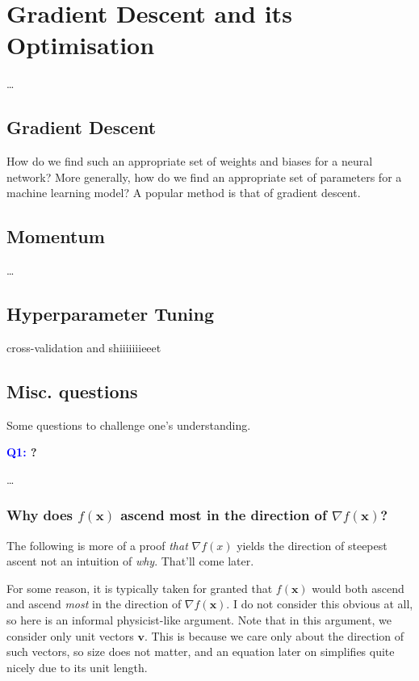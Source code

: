 \documentclass[11pt]{article}
\begin{document}
\section{Gradient Descent and its Optimisation}
\dots

\subsection{Gradient Descent}
How do we find such an appropriate set of weights and biases for a neural network? More generally, how do we find an appropriate set of parameters for a machine learning model? A popular method is that of gradient descent.

\subsection{Momentum}
\dots

\subsection{Hyperparameter Tuning}
cross-validation and shiiiiiiieeet

\subsection{Misc. questions}

Some questions to challenge one's understanding.

\begin{center}
    \textbf{\textcolor{blue}{Q1:} ?}
\end{center}
\dots

\subsubsection{Why does $f(\mathbf{x})$ ascend most in the direction of $\nabla f(\mathbf{x})$?}

The following is more of a proof \textit{that} $\nabla f(x)$ yields the direction of steepest ascent not an intuition of \textit{why}. That'll come later.

For some reason, it is typically taken for granted that $f(\mathbf{x})$ would both ascend and ascend \textit{most} in the direction of $\nabla f(\mathbf{x})$. I do not consider this obvious at all, so here is an informal physicist-like argument. Note that in this argument, we consider only unit vectors $\mathbf{v}$. This is because we care only about the direction of such vectors, so size does not matter, and an equation later on simplifies quite nicely due to its unit length. 
\end{document}
